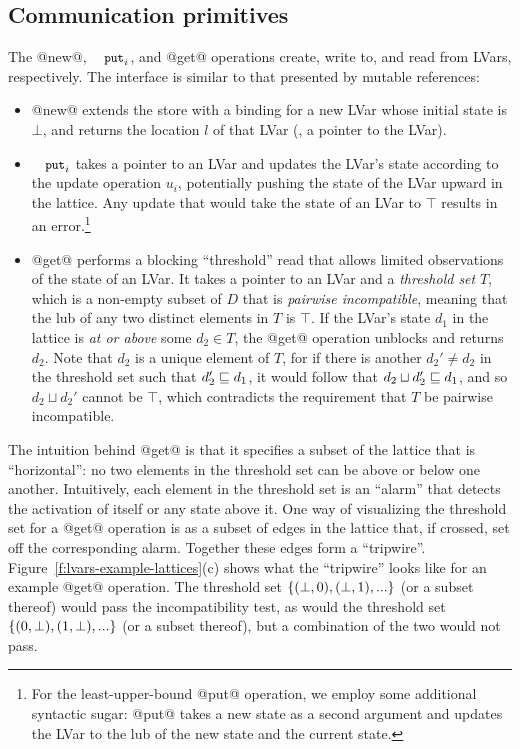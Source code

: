 \subsection{Communication primitives}\label{subsection:lvars-communication-primitives}

The @new@, $\PUTi$, and @get@ operations create, write to, and read
from LVars, respectively. The interface is similar to that presented
by mutable references:

\begin{itemize}
\item @new@ extends the store with a binding for a new LVar whose
  initial state is $\bot$, and returns the location $l$ of that LVar
  (\ie, a pointer to the LVar).
\item $\PUTi$ takes a pointer to an LVar and updates the LVar's state
  according to the update operation $u_i$, potentially pushing the
  state of the LVar upward in the lattice.  Any update that would take
  the state of an LVar to $\top$ results in an error.\footnote{For the
    least-upper-bound @put@ operation, we employ some additional
    syntactic sugar: @put@ takes a new state as a second argument and
    updates the LVar to the lub of the new state and the current
    state.}
\item @get@ performs a blocking ``threshold'' read that allows limited
  observations of the state of an LVar.  It takes a pointer to an LVar
  and a \emph{threshold set} $T$, which is a non-empty subset of $D$
  that is \emph{pairwise incompatible}, meaning that the lub of any
  two distinct elements in $T$ is $\top$.  If the LVar's state $d_1$
  in the lattice is \emph{at or above} some $d_2 \in T$, the @get@
  operation unblocks and returns $d_2$.  Note that $d_2$ is a unique
  element of $T$, for if there is another $d_2' \neq d_2$ in the
  threshold set such that $d_2' \sqsubseteq d_1$, it would follow that
  $d_2 \sqcup d_2' \sqsubseteq d_1$, and so $d_2 \sqcup d_2'$ cannot be
  $\top$, which contradicts the requirement that $T$ be pairwise
  incompatible.
\end{itemize}

The intuition behind @get@ is that it specifies a subset of the
lattice that is ``horizontal'': no two elements in the threshold set
can be above or below one another.  Intuitively, each element in the
threshold set is an ``alarm'' that detects the activation of itself or
any state above it.  One way of visualizing the threshold set for a
@get@ operation is as a subset of edges in the lattice that, if
crossed, set off the corresponding alarm.  Together these edges form a
``tripwire''.  Figure~\ref{f:lvars-example-lattices}(c) shows what the
``tripwire'' looks like for an example @get@ operation.  The
threshold set $\lbrace (\bot, 0), (\bot, 1), ... \rbrace$ (or a subset
thereof) would pass the incompatibility test, as would the threshold
set $\lbrace (0, \bot), (1, \bot), ... \rbrace$ (or a subset thereof), but
a combination of the two would not pass.

